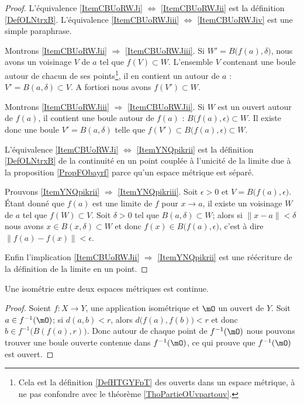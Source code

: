 \begin{proof}
    L'équivalence \ref{ItemCBUoRWJi} \( \Leftrightarrow\) \ref{ItemCBUoRWJii} est la définition \ref{DefOLNtrxB}. L'équivalence \ref{ItemCBUoRWJiii} \( \Leftrightarrow\) \ref{ItemCBUoRWJiv} est une simple paraphrase.

    Montrons \ref{ItemCBUoRWJii} \( \Rightarrow\) \ref{ItemCBUoRWJiii}. Si \( W'=B\big( f(a),\delta \big)\), nous avons un voisinage \( V\) de \( a\) tel que \( f(V)\subset W\). L'ensemble \( V\) contenant une boule autour de chacun de ses points\footnote{Cela est la définition \ref{DefHTGYFpT} des ouverts dans un espace métrique, à ne pas confondre avec le théorème \ref{ThoPartieOUvpartouv}.}, il en contient un autour de \( a\) : \( V'=B(a,\delta)\subset V\). A fortiori nous avons \( f(V')\subset W\).

    Montrons \ref{ItemCBUoRWJiii} \( \Rightarrow\) \ref{ItemCBUoRWJii}. Si \( W\) est un ouvert autour de \( f(a)\), il contient une boule autour de \( f(a)\) : \( B\big( f(a),\epsilon \big)\subset W\). Il existe donc une boule \( V'=B(a,\delta)\) telle que \( f(V')\subset B\big( f(a),\epsilon \big)\subset W\).

    L'équivalence \ref{ItemCBUoRWJi} \( \Leftrightarrow\) \ref{ItemYNQpikrii} est la définition \ref{DefOLNtrxB} de la continuité en un point couplée à l'unicité de la limite due à la proposition \ref{PropFObayrf} parce qu'un espace métrique est séparé.

    Prouvons \ref{ItemYNQpikrii} \( \Rightarrow\) \ref{ItemYNQpikriii}. Soit \( \epsilon>0\) et \( V=B\big( f(a),\epsilon \big)\). Étant donné que \( f(a)\) est une limite de \( f\) pour \( x\to a\), il existe un voisinage \( W\) de \( a\) tel que \( f(W)\subset V\). Soit \( \delta>0\) tel que \( B(a,\delta)\subset W\); alors si \( \| x-a \|<\delta\) nous avons \( x\in B(x,\delta)\subset W\) et donc \( f(x)\in B\big( f(a),\epsilon \big)\), c'est à dire \( \| f(a)-f(x) \|<\epsilon\).

    Enfin l'implication \ref{ItemCBUoRWJii} \( \Rightarrow\) \ref{ItemYNQpikrii} est une réécriture de la définition de la limite en un point.
\end{proof}

\begin{proposition}\label{PropLYMgVMJ}
    Une isométrie entre deux espaces métriques est continue.
\end{proposition}

\begin{proof}
    Soient \( f\colon X\to Y\), une application isométrique et \( \mO\) un ouvert de \( Y\). Soit \( a\in f^{-1}(\mO)\); si \( d(a,b)<r\), alors \( d\big( f(a),f(b) \big)<r\) et donc \( b\in f^{-1}\big( B(f(a),r) \big)\). Donc autour de chaque point de \( f^{-1}(\mO)\) nous pouvons trouver une boule ouverte contenue dans \( f^{-1}(\mO)\), ce qui prouve que \( f^{-1}(\mO)\) est ouvert.
\end{proof}

